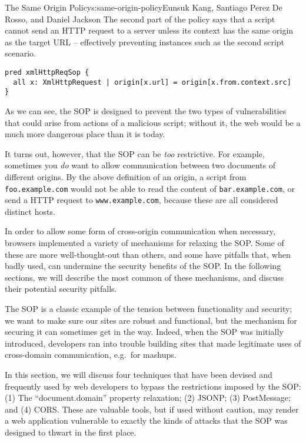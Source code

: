 \begin{aosachapter}{The Same Origin Policy}{s:same-origin-policy}{Eunsuk Kang, Santiago Perez De Rosso, and Daniel Jackson}
The second part of the policy says that a script cannot send an HTTP
request to a server unless its context has the same origin as the target
URL -- effectively preventing instances such as the second script
scenario.

\begin{verbatim}
pred xmlHttpReqSop { 
  all x: XmlHttpRequest | origin[x.url] = origin[x.from.context.src] 
}
\end{verbatim}

As we can see, the SOP is designed to prevent the two types of
vulnerabilities that could arise from actions of a malicious script;
without it, the web would be a much more dangerous place than it is
today.

It turns out, however, that the SOP can be \emph{too} restrictive. For
example, sometimes you \emph{do} want to allow communication between two
documents of different origins. By the above definition of an origin, a
script from \texttt{foo.example.com} would not be able to read the
content of \texttt{bar.example.com}, or send a HTTP request to
\texttt{www.example.com}, because these are all considered distinct
hosts.

In order to allow some form of cross-origin communication when
necessary, browsers implemented a variety of mechanisms for relaxing the
SOP. Some of these are more well-thought-out than others, and some have
pitfalls that, when badly used, can undermine the security benefits of
the SOP. In the following sections, we will describe the most common of
these mechanisms, and discuss their potential security pitfalls.

\label{techniques-for-bypassing-the-sop}

The SOP is a classic example of the tension between functionality and
security; we want to make sure our sites are robust and functional, but
the mechanism for securing it can sometimes get in the way. Indeed, when
the SOP was initially introduced, developers ran into trouble building
sites that made legitimate uses of cross-domain communication, e.g.~for
mashups.

In this section, we will discuss four techniques that have been devised
and frequently used by web developers to bypass the restrictions imposed
by the SOP: (1) The ``document.domain'' property relaxation; (2) JSONP;
(3) PostMessage; and (4) CORS. These are valuable tools, but if used
without caution, may render a web application vulnerable to exactly the
kinds of attacks that the SOP was designed to thwart in the first place.


\end{aosachapter}
